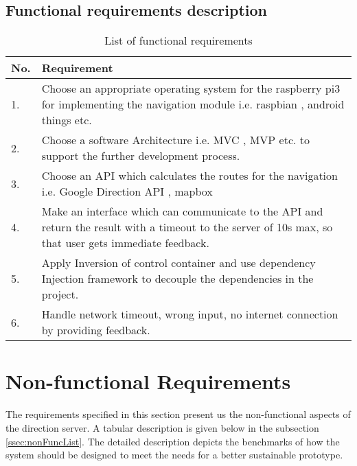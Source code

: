         \subsection{Functional requirements description}
            \label{ssec:FuncList}
            \begin{table}[h!]
                \centering
                    \begin{tabular}{|p{1cm}||p{15cm}|}
                        \hline
                            \textbf{No.} & \textbf{Requirement} \\
                        \hline
                            1. & Choose an appropriate operating system for the raspberry pi3 for implementing 
                            the navigation module i.e. raspbian \cite{raspbien}, 
                            android things \cite{androidThings} etc.\\
                        \hline
                            2. & Choose a software Architecture i.e. MVC \cite{mvc}, MVP \cite{mvp}
                            etc. to support the further development process.\\ 
                        \hline
                            3. & Choose an API which calculates the routes for the navigation i.e. Google Direction API \cite{googleDirecAPI}, mapbox \cite{mapbox} \\     
                        \hline
                            4. & Make an interface which can communicate to the API and return the result with a 
                            timeout to the server of 10s max, so that user gets immediate feedback. \\    
                        \hline  
                            5. & Apply Inversion of control container and use dependency Injection 
                            \cite{Martinfowler2014} framework to decouple the  dependencies 
                            in the project.\\
                        \hline   
                            6. & Handle network timeout, wrong input,
                            no internet connection by providing feedback.\\    
                        \hline    
                    \end{tabular}
                    \caption{List of functional requirements}
                    \label{table:functionalRequirements}
            \end{table}  

    \section{Non-functional Requirements}
        The requirements specified in this section present us the non-functional aspects of the 
        direction server. A tabular description is given below in the subsection 
        \ref{ssec:nonFuncList}. The detailed description depicts the benchmarks of how the system
        should be designed to meet the needs for a better sustainable prototype.

